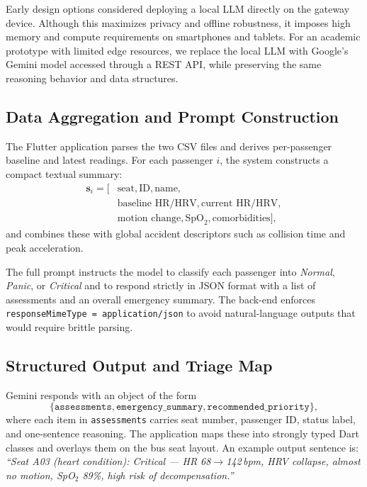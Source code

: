 \documentclass[conference]{IEEEtran}
\begin{document}
Early design options considered deploying a local LLM directly on the gateway device.
Although this maximizes privacy and offline robustness, it imposes high memory and compute requirements on smartphones and tablets.
For an academic prototype with limited edge resources, we replace the local LLM with Google's Gemini model accessed through a REST API, while preserving the same reasoning behavior and data structures.

\subsection{Data Aggregation and Prompt Construction}

The Flutter application parses the two CSV files and derives per-passenger baseline and latest readings.
For each passenger $i$, the system constructs a compact textual summary:
\begin{align}
    \mathbf{s}_i = [&\text{seat}, \text{ID}, \text{name}, \nonumber \\
    &\text{baseline HR/HRV}, \text{current HR/HRV}, \nonumber \\
    &\text{motion change}, \text{SpO}_2, \text{comorbidities}], \nonumber
\end{align}
and combines these with global accident descriptors such as collision time and peak acceleration.

The full prompt instructs the model to classify each passenger into \emph{Normal}, \emph{Panic}, or \emph{Critical} and to respond strictly in JSON format with a list of assessments and an overall emergency summary.
The back-end enforces \texttt{responseMimeType = application/json} to avoid natural-language outputs that would require brittle parsing.

\subsection{Structured Output and Triage Map}

Gemini responds with an object of the form
\begin{equation}
    \{\texttt{assessments}, \texttt{emergency\_summary}, \texttt{recommended\_priority}\},
\end{equation}
where each item in \texttt{assessments} carries seat number, passenger ID, status label, and one-sentence reasoning.
The application maps these into strongly typed Dart classes and overlays them on the bus seat layout.
An example output sentence is:
\emph{``Seat A03 (heart condition): Critical --- HR 68$\rightarrow$142\,bpm, HRV collapse, almost no motion, SpO$_2$ 89\%, high risk of decompensation.''}
\end{document}
